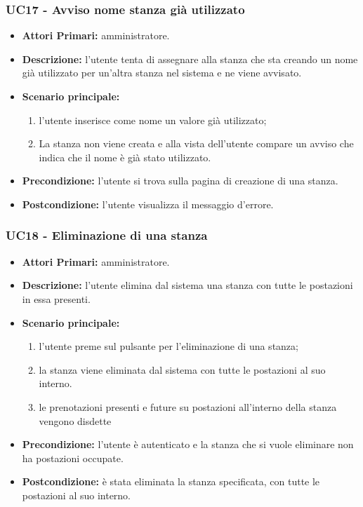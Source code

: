\subsubsection{ UC17 - Avviso nome stanza già utilizzato}
\begin{itemize}
	\item\textbf{Attori Primari:}
	amministratore.
	\item\textbf{Descrizione:}
	l'utente tenta di assegnare alla stanza che sta creando un nome già utilizzato per un'altra stanza nel sistema e ne viene avvisato.
	\item\textbf{Scenario principale:}
	\begin{enumerate}
		\item l'utente inserisce come nome un valore già utilizzato;
		\item La stanza non viene creata e alla vista dell'utente compare un avviso che indica che il nome è già stato utilizzato. 
	\end{enumerate}
	\item\textbf{Precondizione:}
	l'utente si trova sulla pagina di creazione di una stanza.
	\item\textbf{Postcondizione:}
	l'utente visualizza il messaggio d'errore.
\end{itemize}

\subsubsection{ UC18 - Eliminazione di una stanza}
\begin{itemize}
	\item\textbf{Attori Primari:}
	amministratore.
	\item\textbf{Descrizione:} 
	l'utente elimina dal sistema una stanza con tutte le postazioni in essa presenti.
	\item\textbf{Scenario principale:} 
	\begin{enumerate}
		\item l'utente preme sul pulsante per l'eliminazione di una stanza;
		\item la stanza viene eliminata dal sistema con tutte le postazioni al suo interno.
		\item le prenotazioni presenti e future su postazioni all'interno della stanza vengono disdette
	\end{enumerate}
	\item\textbf{Precondizione:} 
	l'utente è autenticato e la stanza che si vuole eliminare non ha postazioni occupate.
	\item\textbf{Postcondizione:}
	è stata eliminata la stanza specificata, con tutte le postazioni al suo interno.
\end{itemize}

